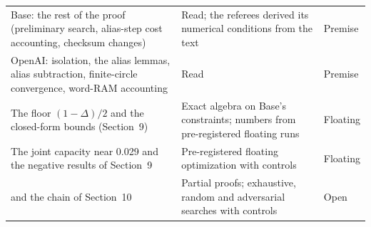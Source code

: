 \documentclass[11pt]{article}
\theoremstyle{plain}
\begin{document}
{\begin{longtable}{@{}>{\raggedright\arraybackslash}p{4.2cm}>{\raggedright\arraybackslash}p{8.7cm}>{\raggedright\arraybackslash}p{2.6cm}@{}}
Base: the rest of the proof (preliminary search, alias-step cost accounting, checksum changes) & Read; the referees derived its numerical conditions from the text & Premise \\
OpenAI: isolation, the alias lemmas, alias subtraction, finite-circle convergence, word-RAM accounting & Read & Premise \\
The floor $(1 - \Delta)/2$ and the closed-form bounds (Section~9) & Exact algebra on Base's constraints; numbers from pre-registered floating runs & Floating \\
The joint capacity near 0.029 and the negative results of Section~9 & Pre-registered floating optimization with controls & Floating \\
{[S]} and the chain of Section~10 & Partial proofs; exhaustive, random and adversarial searches with controls & Open \\
\end{longtable}
}
\end{document}
